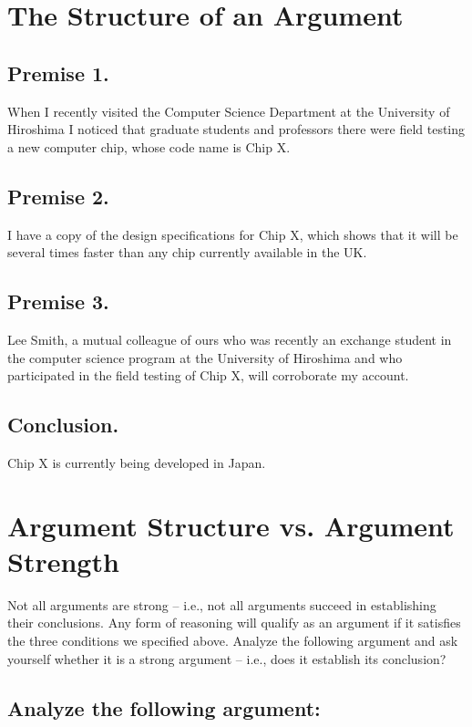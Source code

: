 \documentclass{article}
\begin{document}
\section{The Structure of an Argument}

\subsection{Premise 1.}

When I recently visited the Computer Science Department at the University of Hiroshima I noticed that graduate students and professors there were field testing a new computer chip, whose code name is Chip X.

\subsection{Premise 2.}

I have a copy of the design specifications for Chip X, which shows that it will be several times faster than any chip currently available in the UK.

\subsection{Premise 3.}

Lee Smith, a mutual colleague of ours who was recently an exchange student in the computer science program at the University of Hiroshima and who participated in the field testing of Chip X, will corroborate my account.

\subsection{Conclusion.}

Chip X is currently being developed in Japan.


\section{Argument Structure vs. Argument Strength}

Not all arguments are strong – i.e., not all arguments succeed in establishing their conclusions.
Any form of reasoning will qualify as an argument if it satisfies the three conditions we specified above.
Analyze the following argument and ask yourself whether it is a strong argument – i.e., does it establish its conclusion?

\subsection{Analyze the following argument:}
\end{document}

